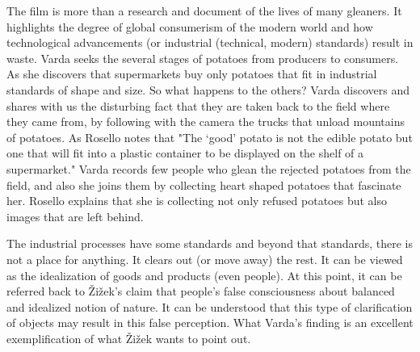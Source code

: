 The film is more than a research and document of the lives of many gleaners. It highlights the degree of global consumerism of the modern world and how technological advancements (or industrial (technical, modern) standards) result in waste. Varda seeks the several stages of potatoes from producers to consumers. As she discovers that supermarkets buy only potatoes that fit in industrial standards of shape and size. So what happens to the others? Varda discovers and shares with us the disturbing fact that they are taken back to the field where they came from, by following with the camera the trucks that unload mountains of potatoes. As Rosello notes that "The ‘good’ potato is not the edible potato but one that will fit into a plastic container to be displayed on the shelf of a supermarket." Varda records few people who glean the rejected potatoes from the field, and also she joins them by collecting heart shaped potatoes that fascinate her. Rosello explains that she is collecting not only refused potatoes but also images that are left behind.


The industrial processes have some standards and beyond that standards, there is not a place for anything. It clears out (or move away) the rest. It can be viewed as the idealization of goods and products (even people). At this point, it can be referred back to Žižek's claim that people's false consciousness about balanced and idealized notion of nature. It can be understood that this type of clarification of objects may result in this false perception. What Varda's finding is an excellent exemplification of what Žižek wants to point out.

